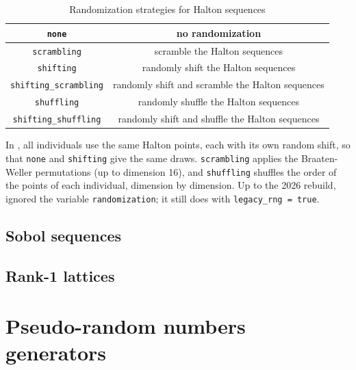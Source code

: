 \begin{table}[htb]
\begin{center}
\begin{tabular}{|c|c|}
\hline
\verb|none| & no randomization \\
\hline
\verb|scrambling| & scramble the Halton sequences \\
\hline
\verb|shifting| & randomly shift the Halton sequences \\
\hline
\verb|shifting_scrambling| & randomly shift and scramble the Halton
sequences \\
\hline
\verb|shuffling| & randomly shuffle the Halton sequences \\
\hline
\verb|shifting_shuffling| & randomly shift and shuffle the Halton sequences \\
\hline
\end{tabular}
\caption{Randomization strategies for Halton sequences}
\label{tab:halton_randomization}
\end{center}
\end{table}

In \amlet{}, all individuals use the same Halton points, each with its
own random shift, so that \verb|none| and \verb|shifting| give the same
draws. \verb|scrambling| applies the Braaten-Weller permutations (up to
dimension 16), and \verb|shuffling| shuffles the order of the points of
each individual, dimension by dimension. Up to the 2026 rebuild,
\amlet{} ignored the variable \verb|randomization|; it still does with
\verb|legacy_rng = true|.

\subsection{Sobol sequences}

\subsection{Rank-1 lattices}

\section{Pseudo-random numbers generators}
\label{sec:rng}

